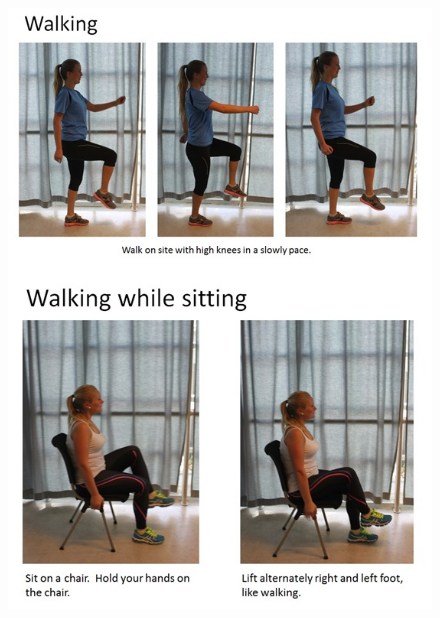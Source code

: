 \begin{figure} [ht!]
\centering
\includegraphics[scale=0.7]{Walking.jpg}
\label{walking}
\end{figure} 

